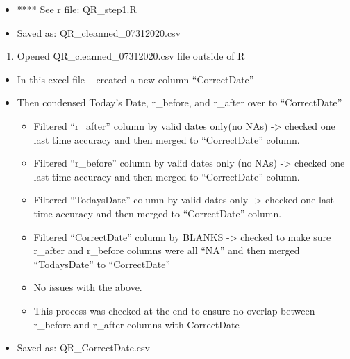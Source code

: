 \documentclass[
]{book}
\providecommand{\tightlist}{%
  \setlength{\itemsep}{0pt}\setlength{\parskip}{0pt}}
\begin{document}
\begin{itemize}
  \begin{itemize}
  \tightlist
  \item
    **** See r file: QR\_step1.R\\
  \item
    Saved as: QR\_cleanned\_07312020.csv
  \end{itemize}
\end{itemize}

\begin{enumerate}
\def\labelenumi{\arabic{enumi}.}
\setcounter{enumi}{4}
\tightlist
\item
  Opened QR\_cleanned\_07312020.csv file outside of R
\end{enumerate}

\begin{itemize}
\tightlist
\item
  In this excel file -- created a new column ``CorrectDate''
\item
  Then condensed Today's Date, r\_before, and r\_after over to ``CorrectDate''

  \begin{itemize}
  \tightlist
  \item
    Filtered ``r\_after'' column by valid dates only(no NAs) -\textgreater{} checked one last time accuracy and then merged to ``CorrectDate'' column.
  \item
    Filtered ``r\_before'' column by valid dates only (no NAs) -\textgreater{} checked one last time accuracy and then merged to ``CorrectDate'' column.
  \item
    Filtered ``TodaysDate'' column by valid dates only -\textgreater{} checked one last time accuracy and then merged to ``CorrectDate'' column.
  \item
    Filtered ``CorrectDate'' column by BLANKS -\textgreater{} checked to make sure r\_after and r\_before columns were all ``NA'' and then merged ``TodaysDate'' to ``CorrectDate''
  \item
    No issues with the above.
  \item
    This process was checked at the end to ensure no overlap between r\_before and r\_after columns with CorrectDate
  \end{itemize}
\item
  Saved as: QR\_CorrectDate.csv
\end{itemize}
\end{document}
